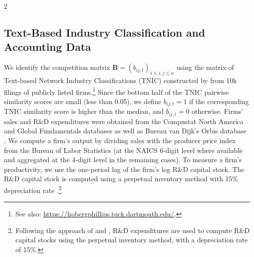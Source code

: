 \documentclass[12pt]{article}
\begin{document}
\begin{spacing}{2}
\subsection{Text-Based Industry Classification and Accounting Data}
\label{sec:industry}
We identify the competition matrix $\mathbf{B}=(b_{ij,t})_{1 \le i,j \le n}$ using the matrix of Text-based Network Industry Classifications (TNIC) constructed by \citet{hoberg2016} from 10k filings of publicly listed firms.\footnote{See also: \url{https://hobergphillips.tuck.dartmouth.edu/}.} Since the bottom half of the TNIC pairwise similarity scores are small (less than 0.05), we define $b_{ij,t}=1$ if the corresponding TNIC similarity score is higher than the median, and $b_{ij,t}=0$ otherwise. Firms' sales and R\&D expenditures were obtained from the Compustat North America and Global Fundamentals databases as well as  Bureau van Dijk's Orbis database \citep{kalemli2024construct}. We compute a firm's output by dividing sales with the producer price index from the Bureau of Labor Statistics (at the NAICS 6-digit level where available and aggregated at the 4-digit level in the remaining cases). To measure a firm's productivity, we use the one-period lag of the firm's log R\&D capital stock. The R\&D capital stock is computed using a perpetual inventory method with 15\% depreciation rate \citep[][]{Bloom2013}.\footnote{Following the approach of \citet[][]{Hall2000} and \citet[][]{Bloom2013}, R\&D expenditures are used to compute R\&D capital stocks using the perpetual inventory method, with a depreciation rate of 15\%. %
} 


\end{spacing}
\end{document}
